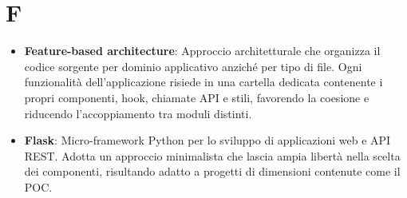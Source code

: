 \documentclass[11pt,a4paper]{article}
\begin{document}
\section*{F}
\begin{itemize}
\item \textbf{Feature-based architecture}: Approccio architetturale che 
organizza il codice sorgente per dominio applicativo anziché per tipo 
di file. Ogni funzionalità dell'applicazione risiede in una cartella 
dedicata contenente i propri componenti, hook, chiamate API e stili, 
favorendo la coesione e riducendo l'accoppiamento tra moduli distinti.

\item \textbf{Flask}: Micro-framework Python per lo sviluppo di 
applicazioni web e API REST. Adotta un approccio minimalista che 
lascia ampia libertà nella scelta dei componenti, risultando 
adatto a progetti di dimensioni contenute come il POC.
\end{itemize}
\newpage
\end{document}

